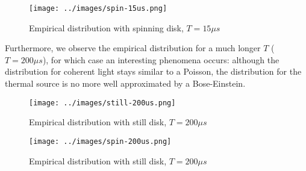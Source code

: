 \documentclass[10pt, a4paper, final]{article}
\begin{document}
\begin{mdframed}
  \begin{figure}[H]
  \centering
  \texttt{[image: ../images/spin-15us.png]}
  \caption{Empirical distribution with spinning disk,  $T = 15\mu s$}
\end{figure}
\end{mdframed}


Furthermore, we observe the empirical distribution for a much longer $T$ ($T=200 \mu s$), for which case an interesting phenomena occurs: although the distribution for coherent light stays similar to a Poisson, the distribution for the thermal source is no more well approximated by a Bose-Einstein. 
\vspace{20pt}
\begin{mdframed}
  \begin{figure}[H]
  \centering
  \texttt{[image: ../images/still-200us.png]}
  \caption{Empirical distribution with still disk,  $T = 200\mu s$}
\end{figure}
\end{mdframed}
\vspace{20pt}
\begin{mdframed}
    \begin{figure}[H]
    \centering
    \texttt{[image: ../images/spin-200us.png]}
    \caption{Empirical distribution with still disk,  $T = 200\mu s$}
  \end{figure}
  \end{mdframed}
\end{document}
